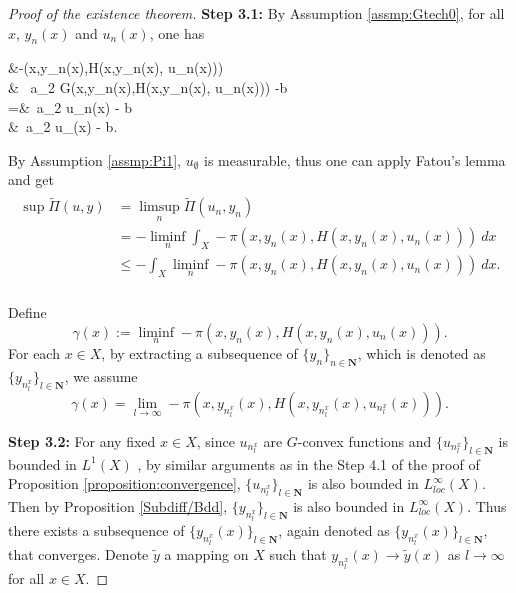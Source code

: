 \documentclass[a4paper, 11pt]{amsart}
\numberwithin{equation}{section}
\theoremstyle{plain}
\theoremstyle{definition}
\theoremstyle{remark}
\newcommand{\N}{\mathbf{N}}
\begin{document}
\begin{proof}[Proof of the existence theorem]
	{\bf Step 3.1: }By Assumption \ref{assmp:Gtech0}, for all $x$, $y_n(x)$ and $u_n(x)$,
	one has
	\begin{flalign*}
	&-\pi(x,y_n(x),H(x,y_n(x), u_n(x)))\\
	\ge & \ a_2 G(x,y_n(x),H(x,y_n(x), u_n(x))) -b \\
	=&\  a_2 u_n(x) - b \\
	\ge&\ a_2 u_{\emptyset}(x) - b.
	\end{flalign*}


By Assumption \ref{assmp:Pi1}, $u_{\emptyset}$ is measurable, thus one can apply Fatou's lemma and get
	\begin{align}\label{3}
	\begin{split}
	\sup \tilde{\Pi}(u,y) & = \limsup\limits_{n} \tilde{\Pi}(u_n, y_n) \\
	&= -\liminf\limits_{n} \int_{X} - \pi(x, y_n(x), H(x,y_n(x),u_n(x)))  ~dx\\
	& \le - \int_{X} \liminf\limits_{n} - \pi(x, y_n(x), H(x,y_n(x),u_n(x)))~ dx. \\
	\end{split}
	\end{align}
	
Define $$\gamma(x):=\liminf\limits_{n} - \pi(x, y_n(x), H(x,y_n(x),u_n(x))). $$
For each $x\in X$, by extracting a subsequence of $\{y_n\}_{n\in \N}$, which is denoted as $\{y_{n^x_l}\}_{l\in \N}$, we assume $$\gamma(x) = \lim\limits_{l \rightarrow \infty} - \pi(x, y_{n_l^x}(x), H(x,y_{n_l^x}(x),u_{n_l^x}(x))).$$ \medskip
	
	{\bf Step 3.2: } 	For any fixed $x \in X$, since $u_{n_l^x}$ are $G$-convex functions and $\{u_{n_l^x}\}_{l\in \N}$ is bounded in $L^1(X)$%
	, by %
	similar arguments as in the Step 4.1 of the proof of Proposition \ref{proposition:convergence}, $\{u_{n_l^x}\}_{l\in \N}$ is also bounded in $L_{loc}^{\infty}(X)$. Then by Proposition \ref{Subdiff/Bdd}, $\{y_{n_l^x}\}_{l\in \N}$ is also bounded in $L_{loc}^{\infty}(X)$. Thus there exists a subsequence of $\{y_{n_l^x}(x)\}_{l\in \N}$, again denoted as $\{y_{n_l^x}(x)\}_{l\in \N}$, that converges. Denote $\tilde{y}$ a mapping on $X$ such that $y_{n_l^x}(x) \rightarrow \tilde{y}(x)$ as $l \rightarrow \infty$ for all $x\in X$.\medskip
	

\end{proof}
\end{document}
